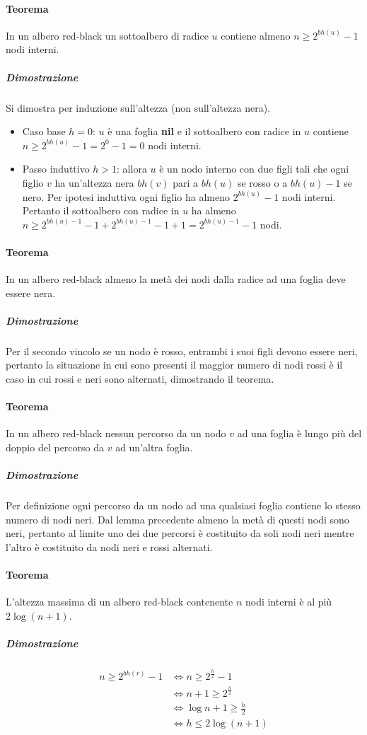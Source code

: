 \paragraph{Teorema}
In un albero red-black un sottoalbero di radice $u$ contiene almeno $n\ge 2^{bh(u)}-1$ nodi interni.
\subparagraph{Dimostrazione}
Si dimostra per induzione sull'altezza (non sull'altezza nera). 
\begin{itemize}
\item Caso base $h=0$: $u$ \`e una foglia \textbf{nil} e il sottoalbero con radice in $u$ contiene $n\ge 2^{bh(u)}-1= 2^0-1=0$ nodi interni.
\item Passo induttivo $h>1$: allora $u$ \`e un nodo interno con due figli tali che ogni figlio $v$ ha un'altezza nera $bh(v)$ pari a $bh(u)$ se rosso o 
a $bh(u)-1$ se nero. Per ipotesi induttiva ogni figlio ha almeno $2^{bh(u)}-1$ nodi interni. Pertanto il sottoalbero con radice in $u$ ha almeno $n\ge 
2^{bh(u)-1}-1+2^{bh(u)-1}-1+1=2^{bh(u)-1}-1$ nodi.
\end{itemize}
\paragraph{Teorema}
In un albero red-black almeno la met\`a dei nodi dalla radice ad una foglia deve essere nera.
\subparagraph{Dimostrazione}
Per il secondo vincolo se un nodo \`e rosso, entrambi i suoi figli devono essere neri, pertanto la situazione in cui sono presenti il maggior numero di nodi 
rossi \`e il caso in cui rossi e neri sono alternati, dimostrando il teorema. 
\paragraph{Teorema}
In un albero red-black nessun percorso da un nodo $v$ ad una foglia \`e lungo pi\`u del doppio del percorso da $v$ ad un'altra foglia.
\subparagraph{Dimostrazione}
Per definizione ogni percorso da un nodo ad una qualsiasi foglia contiene lo stesso numero di nodi neri. Dal lemma precedente almeno la met\`a di questi 
nodi sono neri, pertanto al limite uno dei due percorsi \`e costituito da soli nodi neri mentre l'altro \`e costituito da nodi neri e rossi alternati.
\paragraph{Teorema}
L'altezza massima di un albero red-black contenente $n$ nodi interni \`e al pi\`u $2\log(n+1)$.
\subparagraph{Dimostrazione}
\begin{align*}
n\ge 2^{bh(r)}-1&\Leftrightarrow n\ge 2^{\frac{h}{2}}-1\\
&\Leftrightarrow n+1\ge 2^{\frac{h}{2}}\\
&\Leftrightarrow \log{n+1}\ge \frac{h}{2}\\
&\Leftrightarrow h\le 2\log(n+1)
\end{align*}
